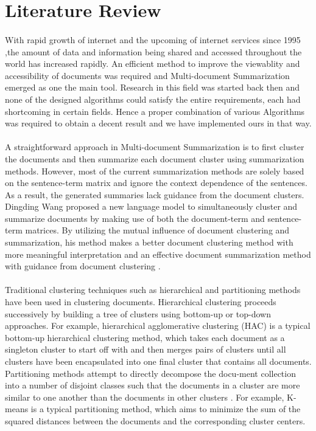 \section{Literature Review} 
\paragraph{} With rapid growth of internet and the upcoming of internet services since 1995 ,the amount of data and information being shared and accessed  throughout the world has increased rapidly. An efficient method to improve the viewablity and accessibility of documents was required and Multi-document Summarization emerged as one the main tool. Research in this field was started back then and none of the designed algorithms could satisfy the entire requirements, each had shortcoming in certain fields. Hence a proper combination of various Algorithms was required to obtain a decent result and we have implemented ours in that way. 
 
\paragraph{} A straightforward approach in Multi-document Summarization is to ﬁrst cluster the documents and then summarize each document cluster using summarization methods. However, most of the current summarization methods are solely based on the sentence-term matrix and ignore the context dependence of the sentences. As a result, the generated summaries lack guidance from the document clusters. Dingding Wang    proposed a new language model to simultaneously cluster and summarize documents by making use of both the document-term and sentence- term matrices. By utilizing the mutual inﬂuence of document clustering and summarization, his method makes a better document clustering method with more meaningful interpretation and an effective document summarization method with guidance from document clustering .  
 
\paragraph{} Traditional clustering techniques such as hierarchical and partitioning methods have been used in clustering documents. Hierarchical clustering proceeds successively by building a tree of clusters using bottom-up or top-down approaches. For example, hierarchical agglomerative clustering (HAC) \cite{Duda} is a typical bottom-up hierarchical clustering method, which takes each document as a singleton cluster to start off with and then merges pairs of clusters until all clusters have been encapsulated into one ﬁnal cluster that contains all documents. Partitioning methods attempt to directly decompose the docu-ment collection into a number of disjoint classes such that the documents in a cluster are more similar to one another than the documents in other clusters \cite{HeEtAl}. For example, K-means \cite{Duda} is a typical partitioning method, which aims to minimize the sum of the squared distances between the documents and the corresponding cluster centers. 
 
